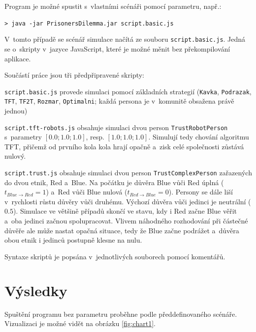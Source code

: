 \documentclass[pdftex,a4paper,12pt]{extarticle}
\newcommand*{\parvsp}{\par\vspace{\baselineskip}\noindent}
\begin{document}
\parvsp
Program je možné spustit s~vlastními scénáři pomocí parametru, např.:

\vspace{2mm}
\texttt{> java -jar PrisonersDilemma.jar script.basic.js}
\vspace{2mm}

V~tomto případě se scénář simulace načítá ze souboru \texttt{script.basic.js}. Jedná se o~skripty v~jazyce JavaScript, které je možné měnit bez překompilování aplikace. 

\parvsp
Součástí práce jsou tři předpřipravené skripty:

\begin{description}

\item \texttt{script.basic.js} provede simulaci pomocí základních strategií (\texttt{Kavka}, \texttt{Podrazak}, \texttt{TFT}, \texttt{TF2T}, \texttt{Rozmar}, \texttt{Optimalni}; každá persona je v~komunitě obsažena právě jednou)

\item \texttt{script.tft-robots.js} obsahuje simulaci dvou person \texttt{TrustRobotPerson} s~parametry $\mathbf{[0.0; 1.0; 1.0]}$, resp. $\mathbf{[1.0; 1.0; 1.0]}$. Simulují tedy chování algoritmu TFT, přičemž od prvního kola kola hrají opačně a~zisk celé společnosti zůstává nulový.

\item \texttt{script.trust.js} obsahuje simulaci dvou person \texttt{TrustComplexPerson} zařazených do dvou etnik, Red a~Blue. Na počátku je důvěra Blue vůči Red úplná ($t_{Blue\to Red}=1$) a~Red vůči Blue nulová ($t_{Red\to Blue}=0$). Persony se dále liší v~rychlosti růstu důvěry vůči druhému. Výchozí důvěra vůči jedinci je neutrální ($0.5$). Simulace ve většině případů skončí ve stavu, kdy i Red začne Blue věřit a~oba jedinci začnou spolupracovat. Vlivem náhodného rozhodování při částečné důvěře ale může nastat opačná situace, tedy že Blue začne podrážet a~důvěra obou etnik i jedinců postupně klesne na nulu.

\end{description}

Syntaxe skriptů je popsána v~jednotlivých souborech pomocí komentářů.

\newpage
\section{Výsledky}
\label{Výsledky}

Spuštění programu bez parametru proběhne podle předdefinovaného scénáře. Vizualizaci je možné vidět na obrázku \ref{fig:chart1}. 
\end{document}
